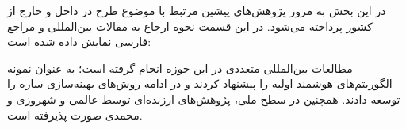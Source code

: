 
در این بخش به مرور پژوهش‌های پیشین مرتبط با موضوع طرح در داخل و خارج از کشور پرداخته می‌شود. در این قسمت نحوه ارجاع به مقالات بین‌المللی و مراجع فارسی نمایش داده شده است:

مطالعات بین‌المللی متعددی در این حوزه انجام گرفته است؛ به عنوان نمونه \cite{Dorigo1996} الگوریتم‌های هوشمند اولیه را پیشنهاد کردند و در ادامه \cite{Rahmatalla2003} روش‌های بهینه‌سازی سازه را توسعه دادند. همچنین در سطح ملی، پژوهش‌های ارزنده‌ای توسط عالمی \cite{Alami1379} و شهروزی و محمدی \cite{Shahrouzi1389} صورت پذیرفته است.
